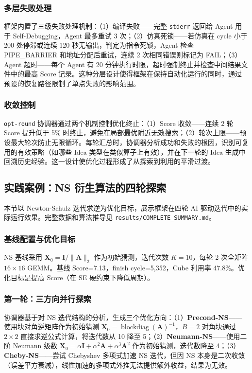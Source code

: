 \documentclass{CjC}
\begin{document}
\subsubsection{多层失败处理}

框架内置了三级失败处理机制：（1）编译失败——完整 \texttt{stderr} 返回给 Agent 用于 Self-Debugging，Agent 最多重试 3 次；（2）仿真死锁——若仿真在 cycle 小于 200 处停滞或连续 120 秒无输出，判定为指令死锁，Agent 检查 PIPE\_BARRIER 和地址分配后重试，连续 2 次相同错误则标记为 FAIL；（3）Agent 超时——每个 Agent 有 20 分钟执行时限，超时强制终止并检查中间结果文件中的最高 Score 记录。这种分层设计使得框架在保持自动化运行的同时，通过预设的恢复路径限制了单点失败的影响范围。

\subsubsection{收敛控制}

\texttt{opt-round} 协调器通过两个机制控制优化终止：（1）Score 收敛——连续 2 轮 Score 提升低于 5\% 时终止，避免在局部最优附近无效搜索；（2）轮次上限——预设最大轮次防止无限循环。每轮汇总时，协调器分析成功和失败的根因，识别可复用的有效策略（如哪些 Idea 类型在类似算子上有效），并在下一轮的 Idea 生成中回溯历史经验。这一设计使优化过程形成了从探索到利用的平滑过渡。

\subsection{实践案例：NS 衍生算法的四轮探索}

本节以 Newton-Schulz 迭代求逆为优化目标，展示框架在四轮 AI 驱动迭代中的实际运行效果。完整数据和算法推导见 \texttt{results/COMPLETE\_SUMMARY.md}。

\subsubsection{基线配置与优化目标}

NS 基线采用 $\bm{X}_0 = \bm{I}/\|\bm{A}\|_2$ 作为初始猜测，迭代次数 $K=10$，每轮 2 次全矩阵 $16\times16$ GEMM。基线 Score=7.13，finish cycle=5,352，Cube 利用率 47.8\%。优化目标是提高 Score（在 SE 硬约束下降低周期）。

\subsubsection{第一轮：三方向并行探索}

协调器基于对 NS 迭代结构的分析，生成三个优化方向：（1）\textbf{Precond-NS}——使用块对角逆矩阵作为初始猜测 $\bm{X}_0 = \operatorname{blockdiag}(\bm{A})^{-1}$，$B=2$ 对角块通过 $2\times2$ 直接求逆公式计算，将迭代数从 10 降至 5；（2）\textbf{Neumann-NS}——使用二阶 Neumann 级数 $\bm{X}_0 = \alpha\bm{I} + \alpha^2\bm{A} + \alpha^3\bm{A}^2$ 作为初始猜测，迭代数降至 4；（3）\textbf{Cheby-NS}——尝试 Chebyshev 多项式加速 NS 迭代，但因 NS 本身是二次收敛（误差平方衰减），线性加速的多项式外推无法提供额外收益，结果为无效。
\end{document}
